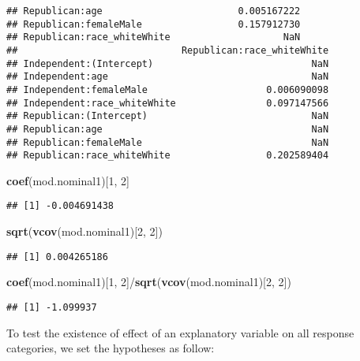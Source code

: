 \documentclass[]{article}
\newenvironment{Shaded}{\begin{snugshade}}{\end{snugshade}}
\newcommand{\KeywordTok}[1]{\textcolor[rgb]{0.13,0.29,0.53}{\textbf{{#1}}}}
\newcommand{\DecValTok}[1]{\textcolor[rgb]{0.00,0.00,0.81}{{#1}}}
\newcommand{\NormalTok}[1]{{#1}}
\begin{document}
\begin{verbatim}
## Republican:age                        0.005167222
## Republican:femaleMale                 0.157912730
## Republican:race_whiteWhite                    NaN
##                             Republican:race_whiteWhite
## Independent:(Intercept)                            NaN
## Independent:age                                    NaN
## Independent:femaleMale                     0.006090098
## Independent:race_whiteWhite                0.097147566
## Republican:(Intercept)                             NaN
## Republican:age                                     NaN
## Republican:femaleMale                              NaN
## Republican:race_whiteWhite                 0.202589404
\end{verbatim}

\begin{Shaded}
\begin{Highlighting}[]
\KeywordTok{coef}\NormalTok{(mod.nominal1)[}\DecValTok{1}\NormalTok{, }\DecValTok{2}\NormalTok{]}
\end{Highlighting}
\end{Shaded}

\begin{verbatim}
## [1] -0.004691438
\end{verbatim}

\begin{Shaded}
\begin{Highlighting}[]
\KeywordTok{sqrt}\NormalTok{(}\KeywordTok{vcov}\NormalTok{(mod.nominal1)[}\DecValTok{2}\NormalTok{, }\DecValTok{2}\NormalTok{])}
\end{Highlighting}
\end{Shaded}

\begin{verbatim}
## [1] 0.004265186
\end{verbatim}

\begin{Shaded}
\begin{Highlighting}[]
\KeywordTok{coef}\NormalTok{(mod.nominal1)[}\DecValTok{1}\NormalTok{, }\DecValTok{2}\NormalTok{]/}\KeywordTok{sqrt}\NormalTok{(}\KeywordTok{vcov}\NormalTok{(mod.nominal1)[}\DecValTok{2}\NormalTok{, }\DecValTok{2}\NormalTok{])}
\end{Highlighting}
\end{Shaded}

\begin{verbatim}
## [1] -1.099937
\end{verbatim}

To test the existence of effect of an explanatory variable on all
response categories, we set the hypotheses as follow:
\end{document}
